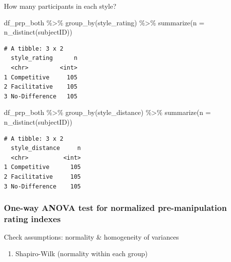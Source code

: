 \documentclass[
  letterpaper,
  DIV=11,
  numbers=noendperiod]{scrartcl}
\newenvironment{Shaded}{\begin{snugshade}}{\end{snugshade}}
\newcommand{\AttributeTok}[1]{\textcolor[rgb]{0.40,0.45,0.13}{#1}}
\newcommand{\FunctionTok}[1]{\textcolor[rgb]{0.28,0.35,0.67}{#1}}
\newcommand{\NormalTok}[1]{\textcolor[rgb]{0.00,0.23,0.31}{#1}}
\newcommand{\SpecialCharTok}[1]{\textcolor[rgb]{0.37,0.37,0.37}{#1}}
\providecommand{\tightlist}{%
  \setlength{\itemsep}{0pt}\setlength{\parskip}{0pt}}\usepackage{longtable,booktabs,array}
\begin{document}
How many participants in each style?

\begin{Shaded}
\begin{Highlighting}[]
\NormalTok{df\_prp\_both }\SpecialCharTok{\%\textgreater{}\%}
  \FunctionTok{group\_by}\NormalTok{(style\_rating) }\SpecialCharTok{\%\textgreater{}\%}
  \FunctionTok{summarize}\NormalTok{(}\AttributeTok{n =} \FunctionTok{n\_distinct}\NormalTok{(subjectID))}
\end{Highlighting}
\end{Shaded}

\begin{verbatim}
# A tibble: 3 x 2
  style_rating      n
  <chr>         <int>
1 Competitive     105
2 Facilitative    105
3 No-Difference   105
\end{verbatim}

\begin{Shaded}
\begin{Highlighting}[]
\NormalTok{df\_prp\_both }\SpecialCharTok{\%\textgreater{}\%}
  \FunctionTok{group\_by}\NormalTok{(style\_distance) }\SpecialCharTok{\%\textgreater{}\%}
  \FunctionTok{summarize}\NormalTok{(}\AttributeTok{n =} \FunctionTok{n\_distinct}\NormalTok{(subjectID))}
\end{Highlighting}
\end{Shaded}

\begin{verbatim}
# A tibble: 3 x 2
  style_distance     n
  <chr>          <int>
1 Competitive      105
2 Facilitative     105
3 No-Difference    105
\end{verbatim}

\subsubsection{One-way ANOVA test for normalized pre-manipulation rating
indexes}\label{one-way-anova-test-for-normalized-pre-manipulation-rating-indexes}

Check assumptions: normality \& homogeneity of variances

\begin{enumerate}
\def\labelenumi{\arabic{enumi}.}
\tightlist
\item
  Shapiro-Wilk (normality within each group)
\end{enumerate}

\begin{Shaded}
\end{Shaded}
\end{document}
